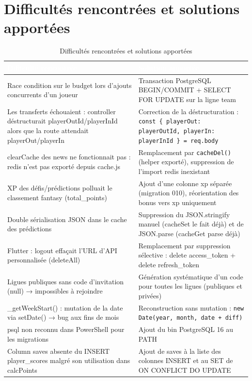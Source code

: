 \section{Difficultés rencontrées et solutions apportées}

\vspace{0.3cm}

\begin{table}[!htbp]
\centering
    \begin{tabularx}{\linewidth}{|X|X|}
        \hline
        \rowcolor{emsigreen}\textcolor{white}{\textbf{Difficulté rencontrée}} & \textcolor{white}{\textbf{Solution apportée}} \\
        \hline
        Race condition sur le budget lors d'ajouts concurrents d'un joueur & Transaction PostgreSQL BEGIN/COMMIT + SELECT FOR UPDATE sur la ligne team \\
        \hline
        Les transferts échouaient : controller déstructurait playerOutId/playerInId alors que la route attendait playerOut/playerIn & Correction de la déstructuration : \texttt{const \{ playerOut: playerOutId, playerIn: playerInId \} = req.body} \\
        \hline
        clearCache des news ne fonctionnait pas : redis n'est pas exporté depuis cache.js & Remplacement par \texttt{cacheDel()} (helper exporté), suppression de l'import redis inexistant \\
        \hline
        XP des défis/prédictions polluait le classement fantasy (total\_points) & Ajout d'une colonne xp séparée (migration 010), réorientation des bonus vers xp uniquement \\
        \hline
        Double sérialisation JSON dans le cache des prédictions & Suppression du JSON.stringify manuel (cacheSet le fait déjà) et de JSON.parse (cacheGet parse déjà) \\
        \hline
        Flutter : logout effaçait l'URL d'API personnalisée (deleteAll) & Remplacement par suppression sélective : delete access\_token + delete refresh\_token \\
        \hline
        Ligues publiques sans code d'invitation (null) → impossibles à rejoindre & Génération systématique d'un code pour toutes les ligues (publiques et privées) \\
        \hline
        \_getWeekStart() : mutation de la date via setDate() → bug aux fins de mois & Reconstruction sans mutation : \texttt{new Date(year, month, date + diff)} \\
        \hline
        psql non reconnu dans PowerShell pour les migrations & Ajout du bin PostgreSQL 16 au PATH \\
        \hline
        Column saves absente du INSERT player\_scores malgré son utilisation dans calcPoints & Ajout de saves à la liste des colonnes INSERT et au SET de ON CONFLICT DO UPDATE \\
        \hline
    \end{tabularx}
\caption{Difficultés rencontrées et solutions apportées}
\end{table}

